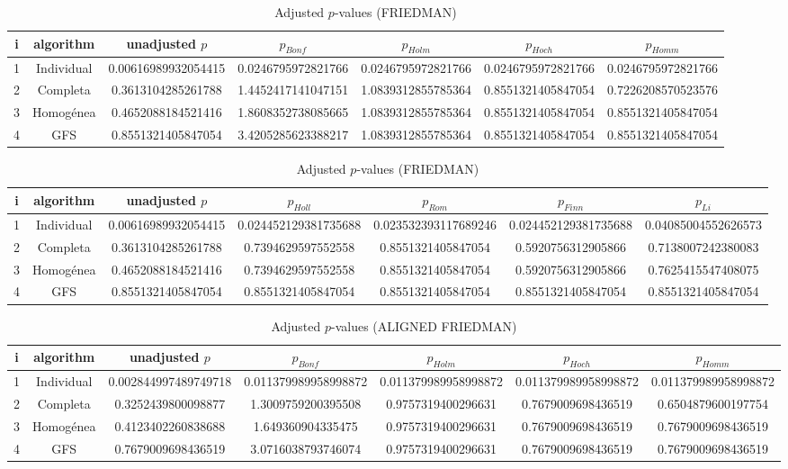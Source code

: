 \documentclass[a4paper,10pt]{article}
\begin{document}
\begin{landscape}
\begin{table}[!htp]
\centering\scriptsize
\caption{Adjusted $p$-values (FRIEDMAN)}
\begin{tabular}{ccccccc}
i&algorithm&unadjusted $p$&$p_{Bonf}$&$p_{Holm}$&$p_{Hoch}$&$p_{Homm}$\\
\hline
1&Individual&0.00616989932054415&0.0246795972821766&0.0246795972821766&0.0246795972821766&0.0246795972821766\\
2&Completa&0.3613104285261788&1.4452417141047151&1.0839312855785364&0.8551321405847054&0.7226208570523576\\
3&Homogénea&0.4652088184521416&1.8608352738085665&1.0839312855785364&0.8551321405847054&0.8551321405847054\\
4&GFS&0.8551321405847054&3.4205285623388217&1.0839312855785364&0.8551321405847054&0.8551321405847054\\
\hline
\end{tabular}
\end{table}

\begin{table}[!htp]
\centering\scriptsize
\caption{Adjusted $p$-values (FRIEDMAN)}
\begin{tabular}{ccccccc}
i&algorithm&unadjusted $p$&$p_{Holl}$&$p_{Rom}$&$p_{Finn}$&$p_{Li}$\\
\hline
1&Individual&0.00616989932054415&0.024452129381735688&0.023532393117689246&0.024452129381735688&0.04085004552626573\\
2&Completa&0.3613104285261788&0.7394629597552558&0.8551321405847054&0.5920756312905866&0.7138007242380083\\
3&Homogénea&0.4652088184521416&0.7394629597552558&0.8551321405847054&0.5920756312905866&0.7625415547408075\\
4&GFS&0.8551321405847054&0.8551321405847054&0.8551321405847054&0.8551321405847054&0.8551321405847054\\
\hline
\end{tabular}
\end{table}


\newpage

\begin{table}[!htp]
\centering\scriptsize
\caption{Adjusted $p$-values (ALIGNED FRIEDMAN)}
\begin{tabular}{ccccccc}
i&algorithm&unadjusted $p$&$p_{Bonf}$&$p_{Holm}$&$p_{Hoch}$&$p_{Homm}$\\
\hline
1&Individual&0.002844997489749718&0.011379989958998872&0.011379989958998872&0.011379989958998872&0.011379989958998872\\
2&Completa&0.3252439800098877&1.3009759200395508&0.9757319400296631&0.7679009698436519&0.6504879600197754\\
3&Homogénea&0.4123402260838688&1.649360904335475&0.9757319400296631&0.7679009698436519&0.7679009698436519\\
4&GFS&0.7679009698436519&3.0716038793746074&0.9757319400296631&0.7679009698436519&0.7679009698436519\\
\hline
\end{tabular}
\end{table}


\end{landscape}
\end{document}
